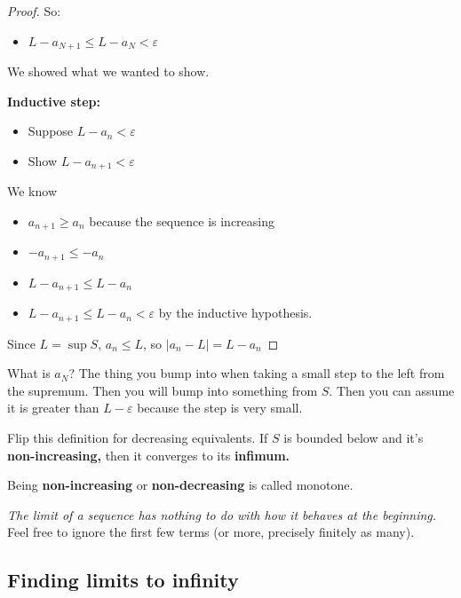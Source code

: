 \documentclass[12pt]{article}
\theoremstyle{plain}
\theoremstyle{remark}
\theoremstyle{definition}
\begin{document}
\begin{proof}
So:

\begin{itemize}
\item
  \(L - a_{N + 1} \leq L - a_{N} < \varepsilon\)
\end{itemize}

We showed what we wanted to show.

\textbf{Inductive step:}

\begin{itemize}
\item
  Suppose \(L - a_{n} < \varepsilon\)
\item
  Show \(L - a_{n + 1} < \varepsilon\)
\end{itemize}

We know

\begin{itemize}
\item
  \(a_{n + 1} \geq a_{n}\) because the sequence is increasing
\item
  \(- a_{n + 1} \leq - a_{n}\)
\item
  \(L - a_{n + 1} \leq L - a_{n}\)
\item
  \(L - a_{n + 1} \leq L - a_{n} < \varepsilon\) by the inductive
  hypothesis.
\end{itemize}

Since \(L = \sup S\), \(a_{n} \leq L\), so
\(\left| a_{n} - L \right| = L - a_{n}\)


\end{proof}

What is \(a_{N}\)? The thing you bump into when taking a small step to
the left from the supremum. Then you will bump into something from
\(S\). Then you can assume it is greater than \(L - \varepsilon\)
because the step is very small.

Flip this definition for decreasing equivalents. If \(S\) is bounded
below and it's \textbf{non-increasing,} then it converges to its
\textbf{infimum.}

Being \textbf{non-increasing} or \textbf{non-decreasing} is called
monotone.

\emph{The limit of a sequence has nothing to do with how it behaves at
the beginning.} Feel free to ignore the first few terms (or more,
precisely finitely as many).



\subsection{Finding limits to
infinity}
\end{document}
